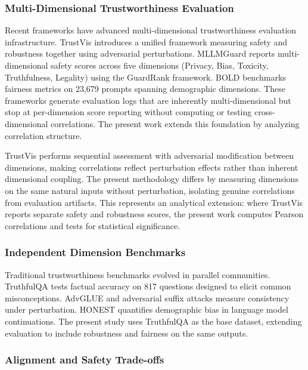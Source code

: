 
\subsubsection{Multi-Dimensional Trustworthiness Evaluation}

Recent frameworks have advanced multi-dimensional trustworthiness evaluation infrastructure. TrustVis \citep{Sun2025} introduces a unified framework measuring safety and robustness together using adversarial perturbations. MLLMGuard \citep{Gu2024} reports multi-dimensional safety scores across five dimensions (Privacy, Bias, Toxicity, Truthfulness, Legality) using the GuardRank framework. BOLD \citep{dhamala2021bold} benchmarks fairness metrics on 23,679 prompts spanning demographic dimensions. These frameworks generate evaluation logs that are inherently multi-dimensional but stop at per-dimension score reporting without computing or testing cross-dimensional correlations. The present work extends this foundation by analyzing correlation structure.

TrustVis performs sequential assessment with adversarial modification between dimensions, making correlations reflect perturbation effects rather than inherent dimensional coupling. The present methodology differs by measuring dimensions on the same natural inputs without perturbation, isolating genuine correlations from evaluation artifacts. This represents an analytical extension: where TrustVis reports separate safety and robustness scores, the present work computes Pearson correlations and tests for statistical significance.

\subsubsection{Independent Dimension Benchmarks}

Traditional trustworthiness benchmarks evolved in parallel communities. TruthfulQA \citep{lin2022truthfulqa} tests factual accuracy on 817 questions designed to elicit common misconceptions. AdvGLUE \citep{wang2021adversarial} and adversarial suffix attacks \citep{zou2023universal} measure consistency under perturbation. HONEST \citep{nozza2021honest} quantifies demographic bias in language model continuations. The present study uses TruthfulQA as the base dataset, extending evaluation to include robustness and fairness on the same outputs.

\subsubsection{Alignment and Safety Trade-offs}

